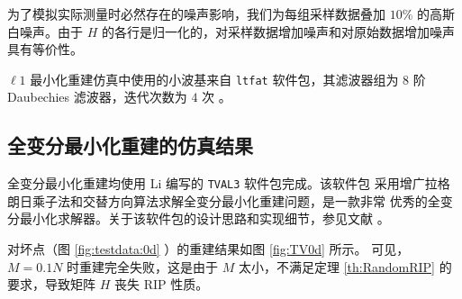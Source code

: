 为了模拟实际测量时必然存在的噪声影响，我们为每组采样数据叠加 $10\%$ 的高斯
白噪声。由于 $H$ 的各行是归一化的，对采样数据增加噪声和对原始数据增加噪声
具有等价性。

$\ell1$ 最小化重建仿真中使用的小波基来自 \verb|ltfat| 软件包，其滤波器组为
$8$ 阶 Daubechies 滤波器，迭代次数为 $4$ 次
\cite{ltfatnote015, ltfatnote030} 。

\subsection{全变分最小化重建的仿真结果}

全变分最小化重建均使用 Li 编写的 \verb|TVAL3| 软件包完成。该软件包
采用增广拉格朗日乘子法和交替方向算法求解全变分最小化重建问题，是一款非常
优秀的全变分最小化求解器。关于该软件包的设计思路和实现细节，参见文献
\cite{TVAL3CBLMaster, TVAL3CBLPhD}。

对坏点（图 \ref{fig:testdata:0d} ）的重建结果如图 \ref{fig:TV0d} 所示。
可见， $M = 0.1 N$ 时重建完全失败，这是由于 $M$ 太小，不满足定理
\ref{th:RandomRIP} 的要求，导致矩阵 $H$ 丧失 RIP 性质。

